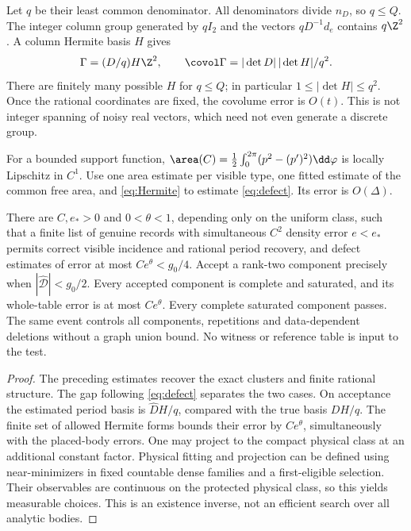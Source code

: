 Let $q$ be their least common denominator. All denominators divide
$n_D$, so $q\le Q$. The integer column group generated by $qI_2$
and the vectors $qD^{-1}d_e$ contains $q\Z^2$. A column Hermite basis
$H$ gives
\begin{equation}\label{eq:Hermite}
 \Gamma=(D/q)H\Z^2,\qquad
 \covol\Gamma=|\det D|\,|\det H|/q^2.
\end{equation}
There are finitely many possible $H$ for $q\le Q$; in particular
$1\le|\det H|\le q^2$. Once the rational coordinates are fixed, the
covolume error is $O(t)$. This is not integer spanning of noisy real
vectors, which need not even generate a discrete group.

For a bounded support function,
$\area(C)=\tfrac12\int_0^{2\pi}(p^2-(p')^2)\dd\varphi$ is locally
Lipschitz in $C^1$. Use one area estimate per visible type, one fitted
estimate of the common free area, and \eqref{eq:Hermite} to estimate
\eqref{eq:defect}. Its error is $O(\Delta)$.

\begin{theorem}\label{thm:certificate}
There are $C,e_*>0$ and $0<\theta<1$, depending only on the uniform
class, such that a finite list of genuine records with simultaneous
$C^2$ density error $e<e_*$ permits correct visible incidence and
rational period recovery, and defect estimates of error at most
$Ce^\theta<g_0/4$. Accept a rank-two component precisely when
$|\widehat{\mathcal D}|<g_0/2$. Every accepted component is complete
and saturated, and its whole-table error is at most $Ce^\theta$.
Every complete saturated component passes. The same event controls all
components, repetitions and data-dependent deletions without a graph
union bound. No witness or reference table is input to the test.
\end{theorem}
\begin{proof}
The preceding estimates recover the exact clusters and finite rational
structure. The gap following \eqref{eq:defect} separates the two cases.
On acceptance the estimated period basis is $\widehat D H/q$, compared
with the true basis $DH/q$. The finite set of allowed Hermite forms
bounds their error by $Ce^\theta$, simultaneously with the placed-body
errors. One may project to the compact physical class at an additional
constant factor. Physical fitting and projection can be defined using
near-minimizers in fixed countable dense families and a first-eligible
selection. Their observables are continuous on the protected physical
class, so this yields measurable choices. This is an existence inverse,
not an efficient search over all analytic bodies.
\end{proof}
